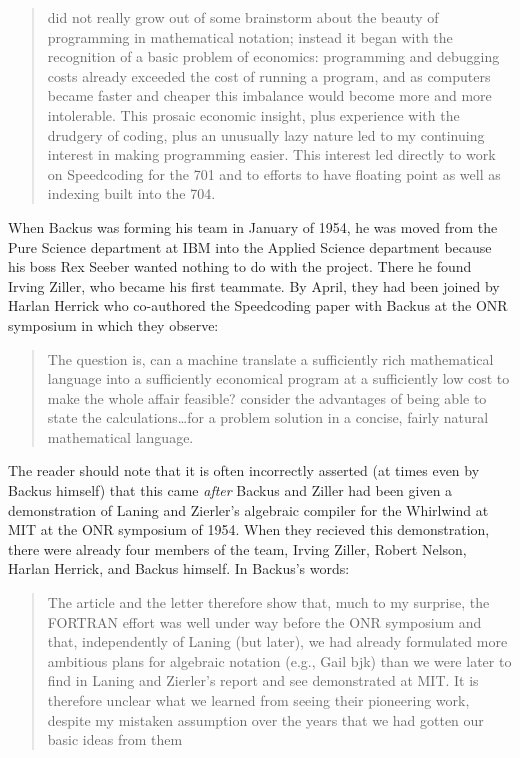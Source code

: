 \begin{quotation}
\FTN{} did not really grow out of some brainstorm about the beauty of
programming in mathematical notation; instead it began with the recognition 
of a basic problem of economics: programming and debugging costs already
exceeded the cost of running a program, and as computers became faster
and cheaper this imbalance would become more and more intolerable. This
prosaic economic insight, plus experience with the drudgery of coding, plus
an unusually lazy nature led to my continuing interest in making programming easier.
This interest led directly to work on Speedcoding for the 701
and to efforts to have floating point as well as indexing built into the 704.
\cite{Backus_1980_Programming_in_America_in_1950s}
\end{quotation}

When Backus was forming his team in January of 1954, he was moved from the Pure Science department at IBM into the
Applied Science department because his boss Rex Seeber wanted nothing to do with the project.
There he found Irving Ziller, who became his first teammate.
By April, they had been joined by Harlan Herrick who co-authored the Speedcoding paper with Backus at the ONR symposium
in which they observe:

\begin{quotation}
The question is, can a machine translate a sufficiently rich mathematical 
language into a sufficiently economical program at a sufficiently low cost to 
make the whole affair feasible?  consider the advantages of being able to state 
the calculations\dots for a problem solution in a concise, fairly natural 
mathematical language. 
\end{quotation}

The reader should note that it is often incorrectly asserted
(at times even by Backus himself\cite{Backus_1980_Programming_in_America_in_1950s})
that this came \textit{after} Backus and Ziller had been given a demonstration
of Laning and Zierler's algebraic compiler for the Whirlwind at MIT at the ONR symposium of 1954.
When they recieved this demonstration, there were already four members of the \FTN{} team,
Irving Ziller, Robert Nelson, Harlan Herrick, and Backus himself.
In Backus's words\cite{Backus_1980_Programming_in_America_in_1950s}:

\begin{quotation}
The article and the letter therefore show that, much to my surprise, the 
FORTRAN effort was well under way before the ONR symposium and that, 
independently of Laning (but later), we had already formulated more ambitious 
plans for algebraic notation (e.g., Gail bjk) than we were later to find in 
Laning and Zierler's report and see demonstrated at MIT. It is therefore 
unclear what we learned from seeing their pioneering work, despite my mistaken 
assumption over the years that we had gotten our basic ideas from them
\end{quotation}

